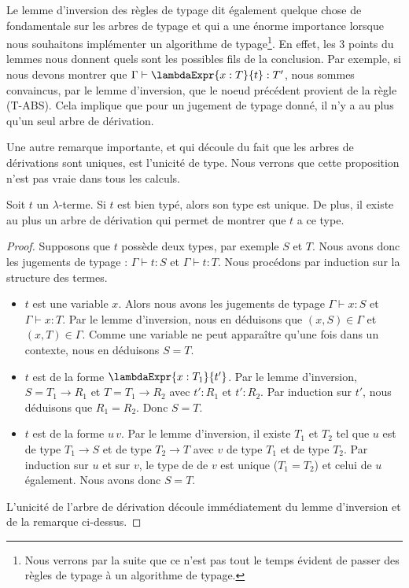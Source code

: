 Le lemme d'inversion des règles de typage dit également quelque chose de
fondamentale sur les arbres de typage et qui a une énorme importance lorsque
nous souhaitons implémenter un algorithme de typage\footnote{Nous verrons par la
suite que ce n'est pas tout le temps évident de passer des règles de typage à un
algorithme de typage.}. En effet, les 3 points du
lemmes nous donnent quels sont les possibles fils de la conclusion. Par
exemple, si nous devons montrer que $\Gamma \vdash \lambdaExpr{x : T}{t} : T'$,
nous sommes convaincus, par le lemme d'inversion, que le noeud précédent
provient de la règle (T-ABS). Cela implique que pour un jugement de typage
donné, il n'y a au plus qu'un seul arbre de dérivation.

Une autre remarque importante, et qui découle du fait que les arbres de
dérivations sont uniques, est l'unicité de type. Nous verrons que cette
proposition n'est pas vraie dans tous les calculs.

\begin{theorem} 
  \label{thm:simply-typed-lambda-calculus-type-unicity}
  Soit $t$ un $\lambda$-terme. Si $t$ est bien typé, alors son type est unique.
  De plus, il existe au plus un arbre de dérivation qui permet de montrer que $t$
  a ce type.
\end{theorem}

\begin{proof}
  \label{proof:simply-typed-lambda-calculus-type-unicity}
  Supposons que $t$ possède deux types, par exemple $S$ et $T$. Nous avons donc les
  jugements de typage : $\Gamma \vdash t : S$ et $\Gamma \vdash t : T$. Nous procédons
  par induction sur la structure des termes.
  \begin{itemize}
   \item $t$ est une variable $x$. Alors nous avons les jugements de typage
     $\Gamma \vdash x : S$ et $\Gamma \vdash x : T$. Par le lemme d'inversion, nous
     en déduisons que $(x, S) \in
     \Gamma$ et $(x, T) \in \Gamma$. Comme une variable ne peut apparaître
     qu'une fois dans un contexte, nous en déduisons $S = T$.

   \item $t$ est de la forme $\lambdaExpr{x : T_{1}}{t'}$. Par le lemme
     d'inversion, $S = T_{1} \rightarrow R_{1}$ et $T = T_{1} \rightarrow
     R_{2}$ avec $t' : R_{1}$ et $t' : R_{2}$. Par induction sur $t'$, nous
     déduisons que $R_{1} = R_{2}$. Donc $S = T$.

   \item $t$ est de la forme $u \, v$. Par le lemme d'inversion, il existe
     $T_{1}$ et $T_{2}$ tel que $u$ est de type $T_{1} \rightarrow S$ et de type $T_{2}
     \rightarrow T$ avec $v$ de type $T_{1}$ et de type $T_{2}$. Par induction
     sur $u$ et sur $v$, le type de de $v$ est unique ($T_{1} = T_{2}$) et celui
     de $u$ également. Nous avons donc $S = T$.
   \end{itemize}

   L'unicité de l'arbre de dérivation découle immédiatement du lemme d'inversion
   et de la remarque ci-dessus.
\end{proof}

